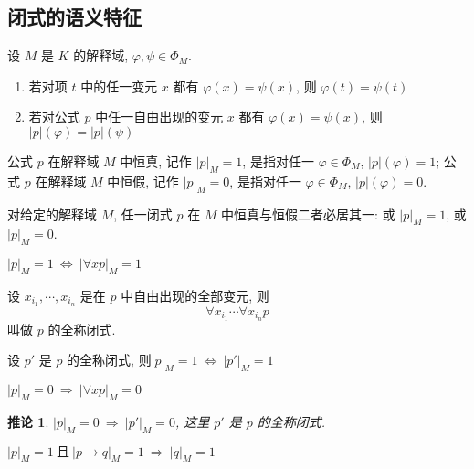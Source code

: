 \documentclass[
    mode=hazy,
    color=blue,
    device=normal,
    lang=cn
]{elegantnote}
\newtheorem{deduction}{推论}[section]
\begin{document}
\subsection{闭式的语义特征}
\begin{proposition}
    设 $M$ 是 $K$ 的解释域, $\varphi, \psi\in\Phi_M$.
    \begin{enumerate}[label = $\arabic*^\circ$]
        \item 若对项 $t$ 中的任一变元 $x$ 都有 $\varphi(x)=\psi(x)$, 则 $\varphi(t)=\psi(t)$
        \item 若对公式 $p$ 中任一自由出现的变元 $x$ 都有 $\varphi(x)=\psi(x)$, 则 $\lvert p\rvert (\varphi)=\lvert p\rvert (\psi)$
    \end{enumerate}
\end{proposition}
\begin{definition}[公式在解释域中恒真与恒假]
    公式 $p$ 在解释域 $M$ 中恒真, 记作 $\lvert p\rvert_M=1$, 是指对任一 $\varphi\in\Phi_M$, $\lvert p\rvert (\varphi)=1$;
    公式 $p$ 在解释域 $M$ 中恒假, 记作 $\lvert p\rvert_M=0$, 是指对任一 $\varphi\in\Phi_M$, $\lvert p\rvert (\varphi)=0$.
\end{definition}
\begin{theorem}
    对给定的解释域 $M$, 任一闭式 $p$ 在 $M$ 中恒真与恒假二者必居其一: 或 $\lvert p\rvert_M=1$, 或 $\lvert p\rvert_M=0$.
\end{theorem}
\begin{proposition}
    $\lvert p\rvert_M=1\ \Leftrightarrow\  \lvert\forall xp\rvert_M=1$
\end{proposition}
\begin{definition}[全称闭式]
    设 $x_{i_1}, \cdots, x_{i_n}$ 是在 $p$ 中自由出现的全部变元, 则
    $$
        \forall x_{i_1}\cdots\forall x_{i_n} p
    $$
    叫做 $p$ 的全称闭式.
\end{definition}
\begin{proposition}
    设 $p'$ 是 $p$ 的全称闭式, 则$\lvert p\rvert_M=1\ \Leftrightarrow\ \lvert p'\rvert_M = 1$
\end{proposition}
\begin{proposition}
    $\lvert p\rvert_M = 0\ \Rightarrow\  \lvert\forall xp\rvert_M=0$
\end{proposition}
\begin{deduction}
    $\lvert p\rvert_M = 0\ \Rightarrow\  \lvert p'\rvert_M=0$, 这里 $p'$ 是 $p$ 的全称闭式.
\end{deduction}
\begin{proposition}
    $\lvert p\rvert_M=1\ \text{且}\ \lvert p\to q\rvert_M = 1\ \Rightarrow\  \lvert q\rvert_M=1$
\end{proposition}
\end{document}
